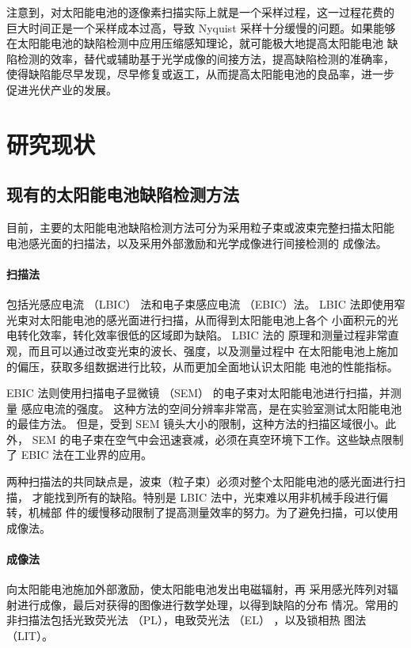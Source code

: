 注意到，对太阳能电池的逐像素扫描实际上就是一个采样过程，这一过程花费的
巨大时间正是一个采样成本过高，导致 Nyquist 采样十分缓慢的问题。如果能够
在太阳能电池的缺陷检测中应用压缩感知理论，就可能极大地提高太阳能电池
缺陷检测的效率，替代或辅助基于光学成像的间接方法，提高缺陷检测的准确率，
使得缺陷能尽早发现，尽早修复或返工，从而提高太阳能电池的良品率，进一步
促进光伏产业的发展。

\section{研究现状}

\subsection{现有的太阳能电池缺陷检测方法}

目前，主要的太阳能电池缺陷检测方法可分为采用粒子束或波束完整扫描太阳能
电池感光面的扫描法，以及采用外部激励和光学成像进行间接检测的
成像法。

\paragraph{扫描法} 包括光感应电流 （LBIC） 法和电子束感应电流 （EBIC）法。
LBIC 法即使用窄光束对太阳能电池的感光面进行扫描，从而得到太阳能电池上各个
小面积元的光电转化效率，转化效率很低的区域即为缺陷\cite{LBIC}。 LBIC 法的
原理和测量过程非常直观，而且可以通过改变光束的波长、强度，以及测量过程中
在太阳能电池上施加的偏压，获取多组数据进行比较，从而更加全面地认识太阳能
电池的性能指标\cite{LBICEnc}。

EBIC 法则使用扫描电子显微镜 （SEM） 的电子束对太阳能电池进行扫描，并测量
感应电流的强度\cite{EBIC}。
这种方法的空间分辨率非常高，是在实验室测试太阳能电池的最佳方法。
但是，受到 SEM 镜头大小的限制，这种方法的扫描区域很小。此外，
SEM 的电子束在空气中会迅速衰减，必须在真空环境下工作。这些缺点限制了 EBIC
法在工业界的应用。

两种扫描法的共同缺点是，波束（粒子束）必须对整个太阳能电池的感光面进行扫描，
才能找到所有的缺陷。特别是 LBIC 法中，光束难以用非机械手段进行偏转，机械部
件的缓慢移动限制了提高测量效率的努力。为了避免扫描，可以使用成像法。

\paragraph{成像法} 向太阳能电池施加外部激励，使太阳能电池发出电磁辐射，再
采用感光阵列对辐射进行成像，最后对获得的图像进行数学处理，以得到缺陷的分布
情况。常用的非扫描法包括光致荧光法 （PL），电致荧光法 （EL） ，以及锁相热
图法（LIT）。

